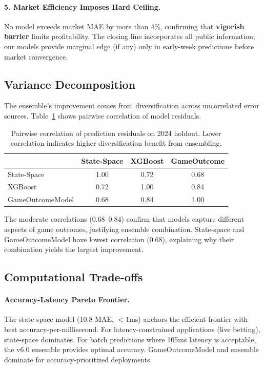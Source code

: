 \paragraph{5. Market Efficiency Imposes Hard Ceiling.}
No model exceeds market MAE by more than 4\%, confirming that \textbf{vigorish barrier} limits profitability. The closing line incorporates all public information; our models provide marginal edge (if any) only in early-week predictions before market convergence.

\subsection{Variance Decomposition}

The ensemble's improvement comes from diversification across uncorrelated error sources. Table~\ref{tab:variance-decomposition} shows pairwise correlation of model residuals.

\begin{table}[htbp]
\centering
\caption[Model residual correlations]{Pairwise correlation of prediction residuals on 2024 holdout. Lower correlation indicates higher diversification benefit from ensembling.}
\label{tab:variance-decomposition}
\small
\begin{tabular}{@{}lccc@{}}
\toprule
& \textbf{State-Space} & \textbf{XGBoost} & \textbf{GameOutcome} \\
\midrule
State-Space & 1.00 & 0.72 & 0.68 \\
XGBoost & 0.72 & 1.00 & 0.84 \\
GameOutcomeModel & 0.68 & 0.84 & 1.00 \\
\bottomrule
\end{tabular}
\end{table}

The moderate correlations (0.68--0.84) confirm that models capture different aspects of game outcomes, justifying ensemble combination. State-space and GameOutcomeModel have lowest correlation (0.68), explaining why their combination yields the largest improvement.

\subsection{Computational Trade-offs}

\paragraph{Accuracy-Latency Pareto Frontier.}\label{fig:pareto-baseline}
The state-space model (10.8 MAE, $<1$ms) anchors the efficient frontier with best accuracy-per-millisecond. For latency-constrained applications (live betting), state-space dominates. For batch predictions where 105ms latency is acceptable, the v6.0 ensemble provides optimal accuracy. GameOutcomeModel and ensemble dominate for accuracy-prioritized deployments.


